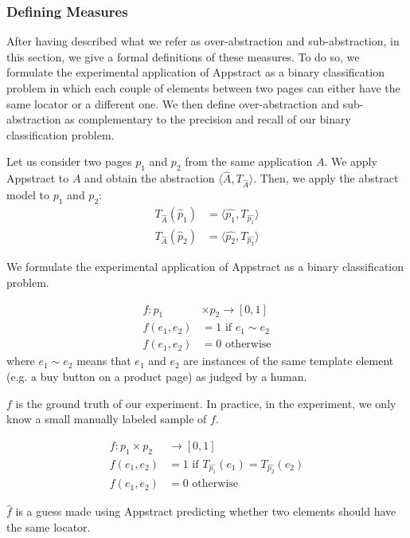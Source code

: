 \subsubsection{Defining Measures}\label{sec_definition_measures}
After having described what we refer as over-abstraction and sub-abstraction, in this section, we give a formal definitions of these measures.
To do so, we formulate the experimental application of Appstract as a binary classification problem in which each couple of elements between two pages can either have the same locator or a different one.
We then define over-abstraction and sub-abstraction as complementary to the precision and recall of our binary classification problem.

Let us consider two pages $p_1$ and $p_2$ from the same application $A$.
We apply Appstract to $A$ and obtain the abstraction $\langle \hat{A}, T_{\hat{A}} \rangle$.
Then, we apply the abstract model to $p_1$ and $p_2$: 
\begin{align}
T_{\hat{A}}(\hat{p}_1) &= \langle \hat{p_1}, T_{\hat{p_1}} \rangle \\
T_{\hat{A}}(\hat{p}_2) &= \langle \hat{p_2}, T_{\hat{p_2}} \rangle
\end{align}

We formulate the experimental application of Appstract as a binary classification problem.
\begin{defn}
\begin{align}
f:  p_1 & \times p_2 \to [0, 1] \\
f(e_1, e_2) &= 1 \text{ if $e_1 \sim e_2$} \\
f(e_1, e_2) &= 0 \text{ otherwise}
\end{align}
where $e_1 \sim e_2$ means that $e_1$ and $e_2$ are instances of the same template element (e.g. a buy button on a product page) as judged by a human.
\end{defn}
$f$ is the ground truth of our experiment. In practice, in the experiment, we only know a small manually labeled sample of $f$.

\begin{defn}
\begin{align}
f:  p_1 \times p_2 & \to [0, 1] \\
f(e_1, e_2) &= 1  \text{ if $T_{\hat{p_1}}(e_1) =  T_{\hat{p_2}}(e_2)$}\\
f(e_1, e_2) &= 0 \text{ otherwise}
\end{align}
\end{defn}
$\hat{f}$ is a guess made using Appstract predicting whether two elements should have the same locator.


